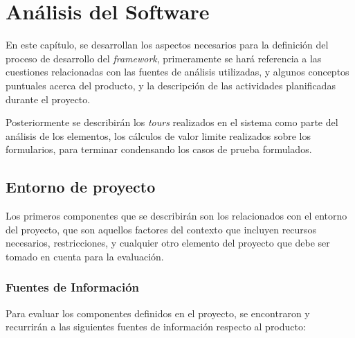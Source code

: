 \chapter{Análisis del Software}

En este capítulo, se desarrollan los aspectos necesarios para la definición del
proceso de desarrollo del \emph{framework}, primeramente se hará referencia a
las cuestiones relacionadas con las fuentes de análisis utilizadas, y algunos
conceptos puntuales acerca del producto, y la descripción de las actividades
planificadas durante el proyecto.

Posteriormente se describirán los \emph{tours} realizados en el sistema como
parte del análisis de los elementos, los cálculos de valor limite realizados
sobre los formularios, para terminar condensando los casos de prueba
formulados.

\section{Entorno de proyecto}
Los primeros componentes que se describirán son los relacionados con el entorno
del proyecto, que son aquellos factores del contexto que incluyen recursos
necesarios, restricciones, y cualquier otro elemento del proyecto que debe ser
tomado en cuenta para la evaluación.

\subsection{Fuentes de Información}
Para evaluar los componentes definidos en el proyecto, se encontraron
y recurrirán a las siguientes fuentes de información respecto al producto:

